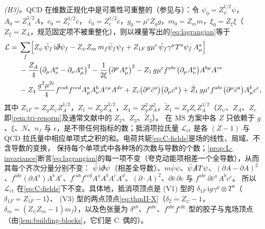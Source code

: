 \documentclass[UTF8,a4paper,11pt,fontset=fandol]{ctexart}
\makeatletter
\theoremstyle{cplain}
\theoremstyle{cdefinition}
\theoremstyle{cremark}
\renewcommand{\proofname}{证明}
\renewenvironment{proof}[1][\proofname]{\par\pushQED{\qed}\normalfont\topsep6\p@\@plus6\p@\relax
  \trivlist\item[\hskip\labelsep\itshape #1\hspace{0.5em}]\ignorespaces}{\popQED\endtrivlist\@endpefalse}
\numberwithin{equation}{section}
\newcommand{\sla}[1]{\slashed{#1}}                  %
\newcommand{\ii}{\mathrm{i}}                        %
\makeatother
\begin{document}
\begin{proof}
\emph{(H3)。}QCD 在维数正规化中是可乘性可重整的（参见\cite[第 16 章]{PeskinSchroeder1995}与\cite{WeinbergQTF2}）：令 $\psi_0=Z_\psi^{1/2}\psi$，$A_0=Z_A^{1/2}A$，$c_0=Z_c^{1/2}c$，
$\bar c_0=Z_c^{1/2}\bar c$，$g_0=\mu^\epsilon Z_gg$，$m_0=Z_mm$，$\xi_0=Z_\xi\xi$（$Z_\xi=Z_A$，规范固定项不被重整化），则以裸量写出的\cref{eq:lagrangian}等于
\begin{equation}\label{eq:reg-Lren}
\begin{aligned}
\mathcal L={}&\sum_f\Bigl[Z_\psi\,\bar\psi_f\,\ii\sla\partial\psi_f-Z_\psi Z_m\,m_f\bar\psi_f\psi_f+Z_{1F}\,g\mu^\epsilon\,\bar\psi_f\gamma^\mu T^a\psi_f\,A^a_\mu\Bigr]\\
&-\frac{Z_A}{4}\bigl(\partial_\mu A^a_\nu-\partial_\nu A^a_\mu\bigr)^2-\frac1{2\xi}\bigl(\partial^\mu A^a_\mu\bigr)^2
-Z_1\,g\mu^\epsilon f^{abc}\bigl(\partial_\mu A^a_\nu\bigr)A^{b\mu}A^{c\nu}\\
&-Z_4\,\frac{g^2\mu^{2\epsilon}}{4}f^{eab}f^{ecd}A^a_\mu A^b_\nu A^{c\mu}A^{d\nu}
+Z_c\bigl(\partial^\mu\bar c^a\bigr)\bigl(\partial_\mu c^a\bigr)+\tilde Z_1\,g\mu^\epsilon f^{abc}\bigl(\partial^\mu\bar c^a\bigr)A^b_\mu c^c ,
\end{aligned}
\end{equation}
其中 $Z_{1F}=Z_gZ_\psi Z_A^{1/2}$，$Z_1=Z_gZ_A^{3/2}$，$Z_4=Z_g^2Z_A^2$，$\tilde Z_1=Z_gZ_cZ_A^{1/2}$（$Z_\psi$、$Z_A$、$Z_c$ 即\cref{rem:tri-renorm}及通常文献中的 $Z_2$、$Z_3$、$\tilde Z_3$）。
在 $\overline{\mathrm{MS}}$ 方案中各 $Z$ 只依赖于 $g$、$\xi$、$N$、$n_f$ 与 $\epsilon$，是不带任何指标的数；抵消项拉氏量 $\mathcal L_{\mathrm{ct}}$ 是各 $(Z-1)$ 与 QCD 拉氏量中相应单项式之积的和。电荷共轭\cref{eq:C-fields}是场的线性、局域、不含导数的变换，
保持每个单项式中各种场的次数与导数的个数；\cref{prop:L-invariance}断言\cref{eq:lagrangian}的每一项不变（夸克动能项相差一个全导数），从而其每个齐次分量分别不变：
$\bar\psi\,\ii\sla\partial\psi$（相差全导数）、$m\bar\psi\psi$、$\bar\psi\sla AT\psi$、$(\partial A-\partial A)^2$、$f^{abc}(\partial A^a)A^bA^c$、$f^{eab}f^{ecd}A^aA^bA^cA^d$、$(\partial\cdot A)^2$、$\partial\bar c\,\partial c$ 与 $f^{abc}\,\partial\bar c^a\,A^bc^c$。
所以 $\mathcal L_{\mathrm{ct}}$ 在\cref{eq:C-fields}下不变。具体地，抵消项顶点是 (V1) 型的 $\delta_{1F}\,\ii g\gamma^\mu\otimes T^a$（$\delta_{1F}=Z_{1F}-1$）、
(V3) 型的两点顶点\cref{eq:thmII-X}（$\delta_2=Z_\psi-1$，$\delta_m=(Z_\psi Z_m-1)m_f$），以及色张量为 $\delta^{ab}$、$f^{abc}$、$f^{abe}f^{cde}$ 型的胶子与鬼场顶点（由\cref{lem:building-blocks}，它们是 C~偶的）。
\end{proof}
\end{document}
